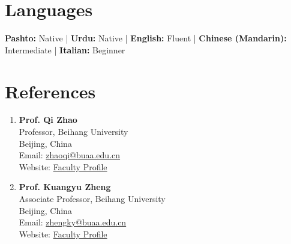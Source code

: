 \documentclass[a4paper,11pt]{article}
\begin{document}
\section{\textbf{Languages}}

\small{
\textbf{Pashto:} Native \quad | \quad
\textbf{Urdu:} Native \quad | \quad
\textbf{English:} Fluent \quad | \quad
\textbf{Chinese (Mandarin):} Intermediate \quad | \quad
\textbf{Italian:} Beginner
}





\section{\textbf{References}}
\small{
\begin{enumerate}[leftmargin=*, labelsep=2mm]


\item \textbf{Prof. Qi Zhao}\\
Professor, Beihang University\\
Beijing, China\\
Email: \href{mailto:zhaoqi@buaa.edu.cn}{zhaoqi@buaa.edu.cn}\\
Website: \href{https://buaa.globalimpact.cn/en/persons/qi-zhao/}{Faculty Profile}


\item \textbf{Prof. Kuangyu Zheng}\\
Associate Professor, Beihang University\\
Beijing, China\\
Email: \href{mailto:zhengky@buaa.edu.cn}{zhengky@buaa.edu.cn}\\
Website: \href{https://buaa.globalimpact.cn/en/persons/kuangyu-zheng/}{Faculty Profile}

\end{enumerate}
}
\vspace{-2mm}
\end{document}
